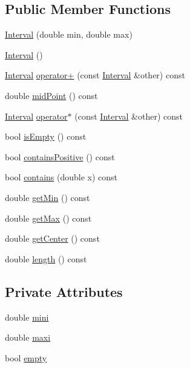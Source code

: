 \subsection*{Public Member Functions}
\begin{DoxyCompactItemize}
\item 
\hyperlink{classInterval_ab0a8f191fb00803d529902f85524e4e2}{Interval} (double min, double max)
\item 
\hyperlink{classInterval_ae48b9a9e9f672f81977627b609e32429}{Interval} ()
\item 
\hyperlink{classInterval}{Interval} \hyperlink{classInterval_a0c42da82e278c84a85a356b5ada6d4f4}{operator+} (const \hyperlink{classInterval}{Interval} \&other) const 
\item 
double \hyperlink{classInterval_a5b6e9f412603b80fd1ca427f6943d993}{mid\+Point} () const 
\item 
\hyperlink{classInterval}{Interval} \hyperlink{classInterval_a7098e87f0ffd13735a06060b0bd6b193}{operator$\ast$} (const \hyperlink{classInterval}{Interval} \&other) const 
\item 
bool \hyperlink{classInterval_a35d360b096b1551e328a25450cde5f72}{is\+Empty} () const 
\item 
bool \hyperlink{classInterval_a34d1acaf0a9b8d273dcbe48280f76894}{contains\+Positive} () const 
\item 
bool \hyperlink{classInterval_a8f1381466a2ed75a6487a92835cf20a8}{contains} (double x) const 
\item 
double \hyperlink{classInterval_aa90ef0b9050beabffcc789c3877cddd0}{get\+Min} () const 
\item 
double \hyperlink{classInterval_ab2fb3df4bc312013c19d54466d9d6470}{get\+Max} () const 
\item 
double \hyperlink{classInterval_ad502b7f22eb07d9ebba23cc9af869487}{get\+Center} () const 
\item 
double \hyperlink{classInterval_ad8cc11adfccd0e30ff3d93ad6a8b5a47}{length} () const 
\end{DoxyCompactItemize}
\subsection*{Private Attributes}
\begin{DoxyCompactItemize}
\item 
double \hyperlink{classInterval_aeb6ee750751e32a0f92d23f0a44ab122}{mini}
\item 
double \hyperlink{classInterval_ac086c91ab2c6f75ce8b3ff3818b38798}{maxi}
\item 
bool \hyperlink{classInterval_a9d9385e1ce6637e5760d26bf80aeada6}{empty}
\end{DoxyCompactItemize}
